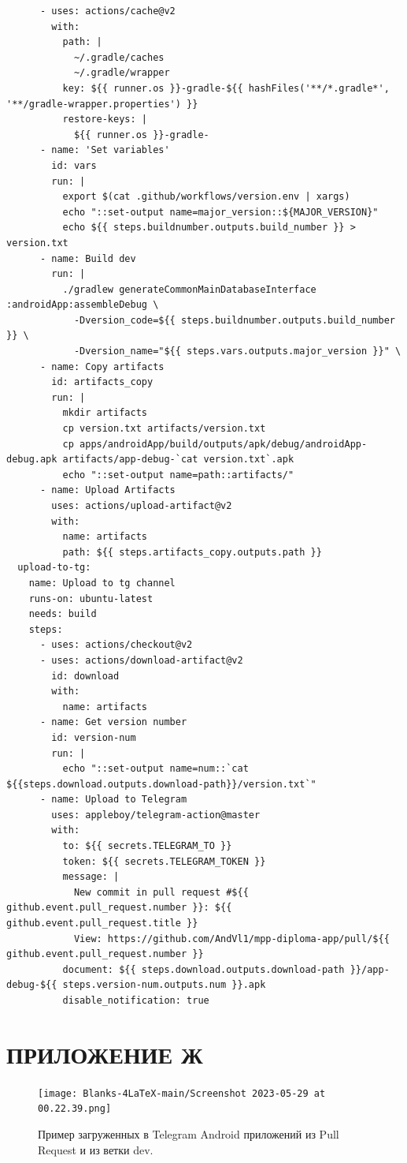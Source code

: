 \documentclass[14pt, russian]{scrartcl}
\newcommand{\anonsection}[1]{\cleardoublepage
\phantomsection
\addcontentsline{toc}{section}{\protect\numberline{}#1}
\section*{#1}\vspace*{2.5ex} %
}
\newenvironment{longlisting}{\captionsetup{type=listing}}{}
\begin{document}
\begin{longlisting}
\begin{verbatim}
      - uses: actions/cache@v2
        with:
          path: |
            ~/.gradle/caches
            ~/.gradle/wrapper
          key: ${{ runner.os }}-gradle-${{ hashFiles('**/*.gradle*', '**/gradle-wrapper.properties') }}
          restore-keys: |
            ${{ runner.os }}-gradle-
      - name: 'Set variables'
        id: vars
        run: |
          export $(cat .github/workflows/version.env | xargs)
          echo "::set-output name=major_version::${MAJOR_VERSION}"
          echo ${{ steps.buildnumber.outputs.build_number }} > version.txt
      - name: Build dev
        run: |
          ./gradlew generateCommonMainDatabaseInterface :androidApp:assembleDebug \
            -Dversion_code=${{ steps.buildnumber.outputs.build_number }} \
            -Dversion_name="${{ steps.vars.outputs.major_version }}" \
      - name: Copy artifacts
        id: artifacts_copy
        run: |
          mkdir artifacts
          cp version.txt artifacts/version.txt
          cp apps/androidApp/build/outputs/apk/debug/androidApp-debug.apk artifacts/app-debug-`cat version.txt`.apk
          echo "::set-output name=path::artifacts/"
      - name: Upload Artifacts
        uses: actions/upload-artifact@v2
        with:
          name: artifacts
          path: ${{ steps.artifacts_copy.outputs.path }}
  upload-to-tg:
    name: Upload to tg channel
    runs-on: ubuntu-latest
    needs: build
    steps:
      - uses: actions/checkout@v2
      - uses: actions/download-artifact@v2
        id: download
        with:
          name: artifacts
      - name: Get version number
        id: version-num
        run: |
          echo "::set-output name=num::`cat ${{steps.download.outputs.download-path}}/version.txt`"
      - name: Upload to Telegram
        uses: appleboy/telegram-action@master
        with:
          to: ${{ secrets.TELEGRAM_TO }}
          token: ${{ secrets.TELEGRAM_TOKEN }}
          message: |
            New commit in pull request #${{ github.event.pull_request.number }}: ${{ github.event.pull_request.title }}
            View: https://github.com/AndVl1/mpp-diploma-app/pull/${{ github.event.pull_request.number }}
          document: ${{ steps.download.outputs.download-path }}/app-debug-${{ steps.version-num.outputs.num }}.apk
          disable_notification: true

\end{verbatim}
\end{longlisting}

\anonsection{ПРИЛОЖЕНИЕ Ж}\label{sect:appl-j}

\vspace{-20pt}

\begin{figure}[!htb]
\centering
  \texttt{[image: Blanks-4LaTeX-main/Screenshot 2023-05-29 at 00.22.39.png]}
\caption{Пример загруженных в Telegram Android приложений из Pull Request и из ветки dev.}
\label{fig:tg-upload}
\end{figure}
\end{document}

